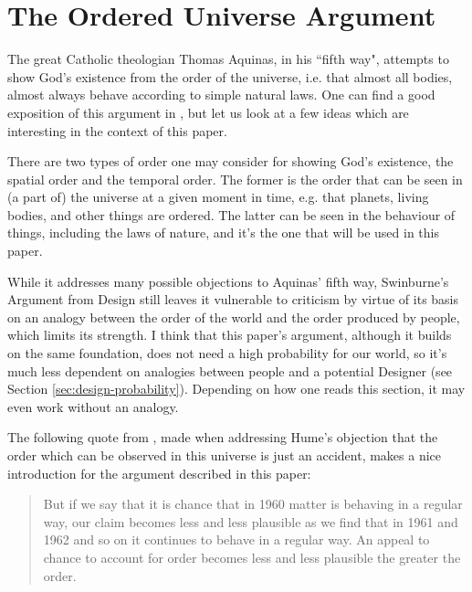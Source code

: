 \documentclass[a4paper
,draft
]{article}
\newcommand{\paper}[1]{paper}
\newcommand{\ghilimele}[1]{``#1"}
\begin{document}
\section{The Ordered Universe Argument}
\label{sec:ordered-universe}

The great Catholic theologian Thomas Aquinas,
in his \ghilimele{fifth way}, attempts to show God's existence from
the order of the universe, i.e. that almost all bodies, almost always
behave according to simple natural laws.
One can find a good exposition of this argument in
\parencite{swinburne1968}, but let us look at a few ideas which are
interesting in the context of this \paper{}.

There are two types of order one may consider for showing God's existence,
the spatial order and the temporal order.
The former is the order that can be seen in (a part of) the universe
at a given moment in time, e.g. that planets, living bodies, and other things
are ordered.
The latter can be seen in the behaviour of things, including the laws of
nature, and it's the one that will be used in this \paper{}.

While it addresses many possible objections to Aquinas' fifth way,
Swinburne’s Argument from Design still leaves it vulnerable to criticism
by virtue of its basis on an analogy between the order of the world and the order
produced by people, which limits its strength.
I think that this \paper{}'s argument, although it builds on the same
foundation, does not need a high probability for our world,
so it’s much less dependent on analogies between people
and a potential Designer
(see Section \ref{sec:design-probability}).
Depending on how one reads this section, it may even work without an analogy.

The following quote from \textcite{swinburne1968}, made when addressing
Hume's objection that the order which can be observed in this universe
is just an accident, makes a nice introduction for the argument
described in this \paper{}:
\begin{quote}
But if we say that it is chance that in 1960 matter is behaving in a
regular way, our claim becomes less and less plausible as we find that in
1961 and 1962 and so on it continues to behave in a regular way. An appeal
to chance to account for order becomes less and less plausible
the greater the order.
\end{quote}

\end{document}
